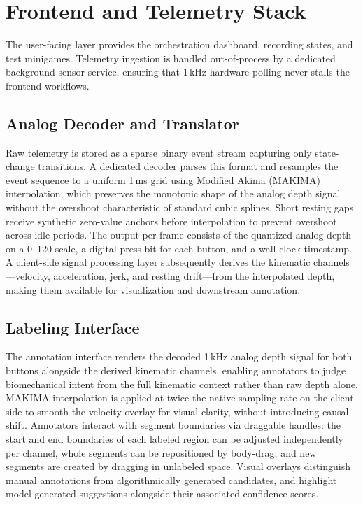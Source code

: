 \section{Frontend and Telemetry Stack}
The user-facing layer provides the orchestration dashboard, recording states, and test minigames. Telemetry ingestion is handled out-of-process by a dedicated background sensor service, ensuring that 1\,kHz hardware polling never stalls the frontend workflows.

\subsection{Analog Decoder and Translator}
Raw telemetry is stored as a sparse binary event stream capturing only state-change transitions. A dedicated decoder parses this format and resamples the event sequence to a uniform 1\,ms grid using Modified Akima (MAKIMA) interpolation, which preserves the monotonic shape of the analog depth signal without the overshoot characteristic of standard cubic splines. Short resting gaps receive synthetic zero-value anchors before interpolation to prevent overshoot across idle periods. The output per frame consists of the quantized analog depth on a 0--120 scale, a digital press bit for each button, and a wall-clock timestamp. A client-side signal processing layer subsequently derives the kinematic channels---velocity, acceleration, jerk, and resting drift---from the interpolated depth, making them available for visualization and downstream annotation.

\subsection{Labeling Interface}
\label{sec:labeling_impl}
The annotation interface renders the decoded 1\,kHz analog depth signal for both buttons alongside the derived kinematic channels, enabling annotators to judge biomechanical intent from the full kinematic context rather than raw depth alone. MAKIMA interpolation is applied at twice the native sampling rate on the client side to smooth the velocity overlay for visual clarity, without introducing causal shift. Annotators interact with segment boundaries via draggable handles: the start and end boundaries of each labeled region can be adjusted independently per channel, whole segments can be repositioned by body-drag, and new segments are created by dragging in unlabeled space. Visual overlays distinguish manual annotations from algorithmically generated candidates, and highlight model-generated suggestions alongside their associated confidence scores.


